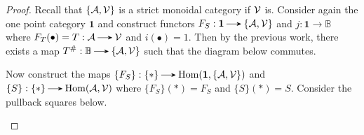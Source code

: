 \begin{proof}
    Recall that $\{\mathcal{A}, \mathcal{V}\}$ is a strict monoidal category if $\mathcal{V}$ is. Consider again the one point category $\mathbf{1}$ and construct functors $F_S: \mathbf{1} \to \{\aa, \vv\}$ 
    and
    $j: \mathbf{1} \to  \mathbb{B}$
    where $F_T(\bullet) = T: \aa \to \vv$ and $i(\bullet) = 1$. Then by the previous work,
    there exists a map $T^{\#}: \mathbb{B} \to \{\aa, \vv\}$ such that the diagram below commutes.
    \begin{center}
    \end{center}
    
    Now construct the maps $\{F_S\}: \{*\} \to \hom(\mathbf{1}, \{\aa, \vv\})$ and $\{S\}: \{*\} \to \hom (\aa, \vv)$ where $\{F_S\}(*) = F_S$ and $\{S\}(*) = S$. Consider the pullback squares below. 
    \begin{center}
    \end{center}
    

\end{proof}
